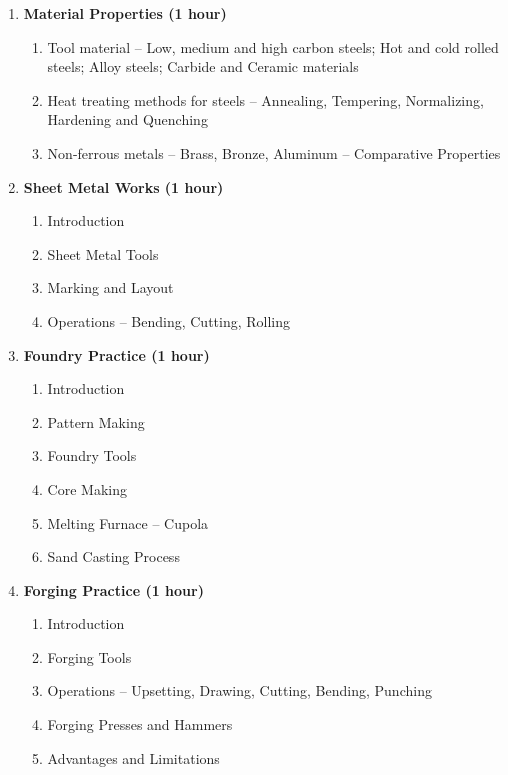 \begin{enumerate}
    \item \textbf{Material Properties \hfill (1 hour)}
    \begin{enumerate}
        \item Tool material -- Low, medium and high carbon steels; Hot and cold rolled steels; Alloy steels; Carbide and Ceramic materials
        \item Heat treating methods for steels -- Annealing, Tempering, Normalizing, Hardening and Quenching
        \item Non-ferrous metals -- Brass, Bronze, Aluminum -- Comparative Properties
    \end{enumerate}
    
    \item \textbf{Sheet Metal Works \hfill (1 hour)}
    \begin{enumerate}
        \item Introduction
        \item Sheet Metal Tools 
        \item Marking and Layout
        \item Operations -- Bending, Cutting, Rolling
    \end{enumerate}
    
    \item \textbf{Foundry Practice \hfill (1 hour)}
    \begin{enumerate}
        \item Introduction
        \item Pattern Making
        \item Foundry Tools
        \item Core Making
        \item Melting Furnace -- Cupola
        \item Sand Casting Process
    \end{enumerate}
    
    \item \textbf{Forging Practice \hfill (1 hour)}
    \begin{enumerate}
        \item Introduction 
        \item Forging Tools
        \item Operations -- Upsetting, Drawing, Cutting, Bending, Punching
        \item Forging Presses and Hammers
        \item Advantages and Limitations
    \end{enumerate}


\end{enumerate}
